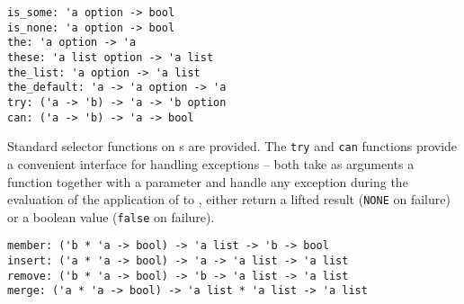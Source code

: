 \begin{isabellebody}
\begin{isamarkuptext}
\begin{quotation}
  \end{quotation}%
\end{isamarkuptext}%
\isamarkuptrue%
%
\isamarkuptrue%
%
\isadelimmlref
%
\endisadelimmlref
%
\isatagmlref
%
\begin{isamarkuptext}%
\begin{mldecls}
  \verb|is_some: 'a option -> bool| \\
  \verb|is_none: 'a option -> bool| \\
  \verb|the: 'a option -> 'a| \\
  \verb|these: 'a list option -> 'a list| \\
  \verb|the_list: 'a option -> 'a list| \\
  \verb|the_default: 'a -> 'a option -> 'a| \\
  \verb|try: ('a -> 'b) -> 'a -> 'b option| \\
  \verb|can: ('a -> 'b) -> 'a -> bool| \\
  \end{mldecls}%
\end{isamarkuptext}%
\isamarkuptrue%
%
\endisatagmlref
{\isafoldmlref}%
%
\isadelimmlref
%
\endisadelimmlref
%
\begin{isamarkuptext}%
Standard selector functions on s are provided.  The
  \verb|try| and \verb|can| functions provide a convenient interface for
  handling exceptions -- both take as arguments a function 
  together with a parameter  and handle any exception during
  the evaluation of the application of  to , either
  return a lifted result (\verb|NONE| on failure) or a boolean value
  (\verb|false| on failure).%
\end{isamarkuptext}%
\isamarkuptrue%
%
\isamarkuptrue%
%
\isamarkuptrue%
%
\begin{isamarkuptext}%
\begin{mldecls}
  \verb|member: ('b * 'a -> bool) -> 'a list -> 'b -> bool| \\
  \verb|insert: ('a * 'a -> bool) -> 'a -> 'a list -> 'a list| \\
  \verb|remove: ('b * 'a -> bool) -> 'b -> 'a list -> 'a list| \\
  \verb|merge: ('a * 'a -> bool) -> 'a list * 'a list -> 'a list| \\

\end{mldecls}
\end{isamarkuptext}
\end{isabellebody}
